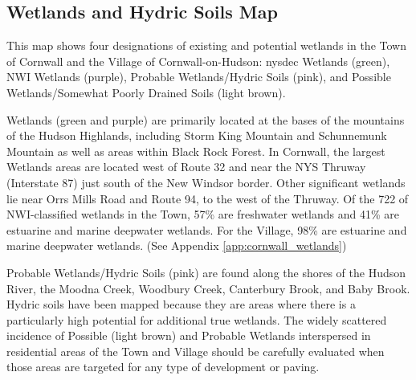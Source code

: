 \subsection*{Wetlands and Hydric Soils Map}
This map shows four designations of existing and potential wetlands in the Town 
of Cornwall and the Village of Cornwall-on-Hudson: \gls{nysdec} Wetlands 
(green), NWI Wetlands (purple), Probable Wetlands/Hydric Soils (pink), and 
Possible Wetlands/Somewhat Poorly Drained Soils (light brown). 

Wetlands (green and purple) are primarily located at the bases of the mountains 
of the Hudson Highlands, including Storm King Mountain and Schunnemunk Mountain 
as well as areas within Black Rock Forest. In Cornwall, the largest Wetlands 
areas are located west of Route 32 and near the NYS Thruway (Interstate 87) just 
south of the New Windsor border. Other significant wetlands lie near Orrs Mills 
Road and Route 94, to the west of the Thruway. Of the 722 of NWI-classified 
wetlands in the Town, 57\% are freshwater wetlands and 41\% are estuarine and 
marine deepwater wetlands. For the Village, 98\% are estuarine and marine 
deepwater wetlands. (See Appendix \ref{app:cornwall_wetlands})

Probable Wetlands/Hydric Soils (pink) are found along the shores of the Hudson 
River, the Moodna Creek, Woodbury Creek, Canterbury Brook, and Baby Brook. 
Hydric soils have been mapped because they are areas where there is a 
particularly high potential for additional true wetlands. The widely scattered 
incidence of Possible (light brown) and Probable Wetlands interspersed in 
residential areas of the Town and Village should be carefully evaluated when 
those areas are targeted for any type of development or paving.
\label{map:wetlandsandhydricsoils}


